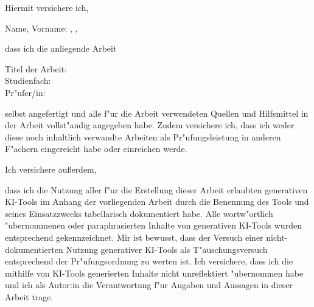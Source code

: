 
Hiermit versichere ich,

\vspace{0.5em}

Name, Vorname: \autorNachname, \autorVorname,

\vspace{0.5em}

dass ich die anliegende Arbeit

\vspace{0.5em}

Titel der Arbeit: \titel \\
Studienfach: \studiengang \\
Pr"ufer/in: \betreuer

\vspace{0.5em}

selbst angefertigt und alle f"ur die Arbeit verwendeten Quellen und Hilfsmittel in der Arbeit vollst"andig angegeben habe. Zudem versichere ich, dass ich weder diese noch inhaltlich verwandte Arbeiten als Pr"ufungsleistung in anderen F"achern eingereicht habe oder einreichen werde.

\vspace{0.5em}


Ich versichere außerdem, 


\vspace{0.5em}

dass ich die Nutzung aller f"ur die Erstellung dieser Arbeit erlaubten generativen KI-Tools im Anhang der vorliegenden Arbeit durch die Benennung des Tools und seines Einsatzzwecks tabellarisch dokumentiert habe. Alle wortw"ortlich "ubernommenen oder paraphrasierten Inhalte von generativen KI-Tools wurden entsprechend gekennzeichnet. Mir ist bewusst, dass der Versuch einer nicht-dokumentierten Nutzung generativer KI-Tools als T"auschungsversuch entsprechend der Pr"ufungsordnung zu werten ist. Ich versichere, dass ich die mithilfe von KI-Tools generierten Inhalte nicht unreflektiert "ubernommen habe und ich als Autor:in die Verantwortung f"ur Angaben und Aussagen in dieser Arbeit trage.

